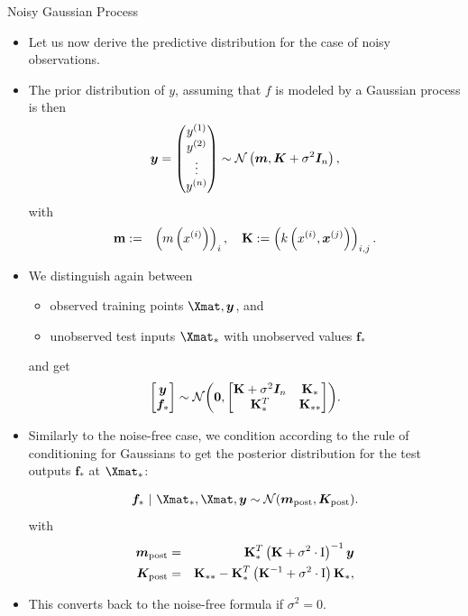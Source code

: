 \begin{vbframe}{Noisy Gaussian Process}
\framebreak 

\begin{itemize}
  \item Let us now derive the predictive distribution for the case of noisy observations. 
  \item The prior distribution of $y$, assuming that $f$ is modeled by a Gaussian process is then
  $$
    \bm{y} = \begin{pmatrix} \yi[1] \\ \yi[2] \\ \vdots \\ \yi[n] \end{pmatrix} \sim \mathcal{N}\left(\bm{m}, \bm{K} + \sigma^2 \bm{I}_n \right),
  $$
  with 
  \begin{eqnarray*}
    \textbf{m} &:=& \left(m\left(\xi\right)\right)_{i}, \quad
    \textbf{K} := \left(k\left(\xi, \xv^{(j)}\right)\right)_{i,j}. 
  \end{eqnarray*}

  \framebreak 
  
  \item We distinguish again between 
  \begin{itemize}
    \item observed training points $\Xmat, \yv$, and 
    \item unobserved test inputs $\Xmat_*$ with unobserved values $\bm{f}_*$
  \end{itemize} 
  and get
  $$
  \begin{bmatrix}
  \bm{y} \\
  \bm{f}_*
  \end{bmatrix} \sim  
    \mathcal{N}\biggl(\bm{0}, \begin{bmatrix} \Kmat + \sigma^2 \bm{I}_n & \Kmat_* \\ \Kmat_*^T & \Kmat_{**} \end{bmatrix}\biggr).
  $$

\framebreak

  \item Similarly to the noise-free case, we condition according to the rule of conditioning for Gaussians to get the posterior distribution for the test outputs $\bm{f}_*$ at $\Xmat_*$: 

  \begin{eqnarray*}
    \bm{f}_* ~|~ \Xmat_*, \Xmat, \bm{y} \sim \mathcal{N}(\bm{m}_{\text{post}}, \bm{K}_\text{post}).
\end{eqnarray*}
  with 
  \begin{eqnarray*}
    \bm{m}_{\text{post}} &=& \Kmat_{*}^{T} \left(\Kmat+ \sigma^2 \cdot \id\right)^{-1}\bm{y} \\
    \bm{K}_\text{post} &=& \Kmat_{**} - \Kmat_*^T \left(\Kmat ^{-1} + \sigma^2 \cdot \id\right)\Kmat_*,
  \end{eqnarray*}
\item This converts back to the noise-free formula if $\sigma^2 = 0$.


\end{itemize}
\end{vbframe}
